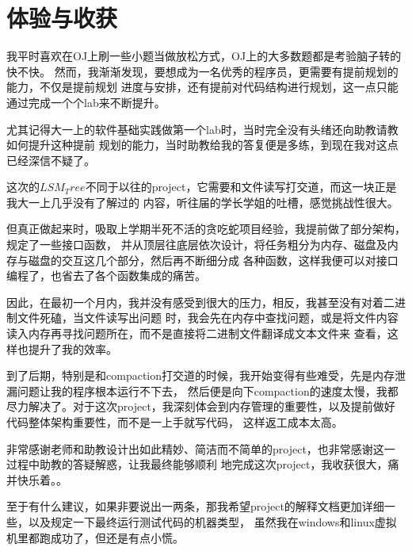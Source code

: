 \documentclass{article}
\begin{document}
\newpage
\section{体验与收获}
我平时喜欢在OJ上刷一些小题当做放松方式，OJ上的大多数题都是考验脑子转的快不快。
然而，我渐渐发现，要想成为一名优秀的程序员，更需要有提前规划的能力，不仅是提前规划
进度与安排，还有提前对代码结构进行规划，这一点只能通过完成一个个lab来不断提升。\par
尤其记得大一上的软件基础实践做第一个lab时，当时完全没有头绪还向助教请教如何提升这种提前
规划的能力，当时助教给我的答复便是多练，到现在我对这点已经深信不疑了。\par
这次的$LSM_Tree$不同于以往的project，它需要和文件读写打交道，而这一块正是我大一上几乎没有了解过的
内容，听往届的学长学姐的吐槽，感觉挑战性很大。\par
但真正做起来时，吸取上学期半死不活的贪吃蛇项目经验，我提前做了部分架构，规定了一些接口函数，
并从顶层往底层依次设计，将任务粗分为内存、磁盘及内存与磁盘的交互这几个部分，然后再不断细分成
各种函数，这样我便可以对接口编程了，也省去了各个函数集成的痛苦。\par
因此，在最初一个月内，我并没有感受到很大的压力，相反，我甚至没有对着二进制文件死磕，当文件读写出问题
时，我会先在内存中查找问题，或是将文件内容读入内存再寻找问题所在，而不是直接将二进制文件翻译成文本文件来
查看，这样也提升了我的效率。\par
到了后期，特别是和compaction打交道的时候，我开始变得有些难受，先是内存泄漏问题让我的程序根本运行不下去，
然后便是向下compaction的速度太慢，我都尽力解决了。对于这次project，我深刻体会到内存管理的重要性，以及提前做好代码整体架构重要性，而不是一上手就写代码，
这样返工成本太高。\par
非常感谢老师和助教设计出如此精妙、简洁而不简单的project，也非常感谢这一过程中助教的答疑解惑，让我最终能够顺利
地完成这次project，我收获很大，痛并快乐着。。\par
至于有什么建议，如果非要说出一两条，那我希望project的解释文档更加详细一些，以及规定一下最终运行测试代码的机器类型，
虽然我在windows和linux虚拟机里都跑成功了，但还是有点小慌。
\end{document}

